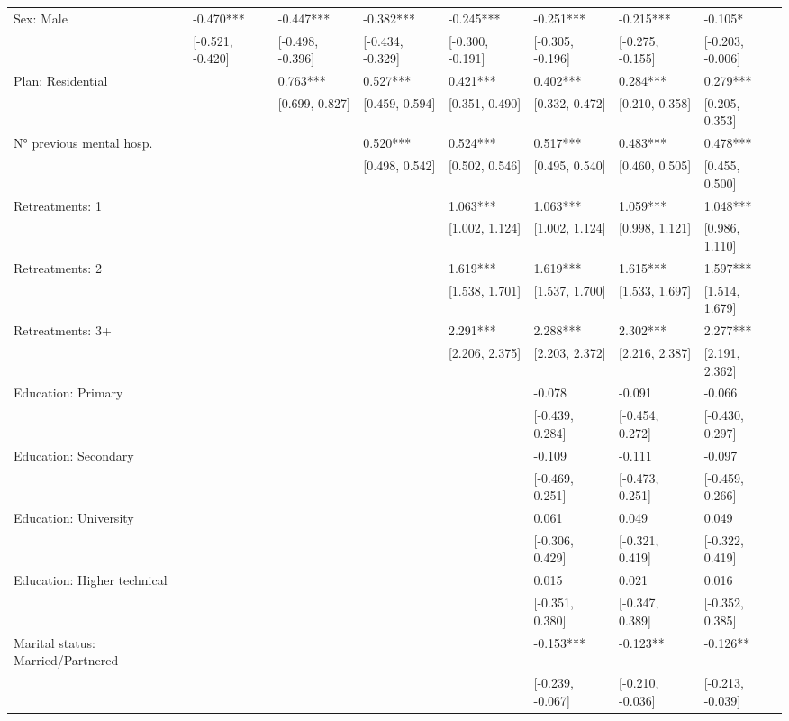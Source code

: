\documentclass[
  spanish,
  10pt,
]{article}
\begin{document}
\begin{table}[H]
{\begin{tabular}[t]{llllllll}
Sex: Male & -0.470*** & -0.447*** & -0.382*** & -0.245*** & -0.251*** & -0.215*** & -0.105*\\
 & {}[-0.521, -0.420] & {}[-0.498, -0.396] & {}[-0.434, -0.329] & {}[-0.300, -0.191] & {}[-0.305, -0.196] & {}[-0.275, -0.155] & {}[-0.203, -0.006]\\
Plan: Residential &  & 0.763*** & 0.527*** & 0.421*** & 0.402*** & 0.284*** & 0.279***\\
 &  & {}[0.699, 0.827] & {}[0.459, 0.594] & {}[0.351, 0.490] & {}[0.332, 0.472] & {}[0.210, 0.358] & {}[0.205, 0.353]\\
N° previous mental hosp. &  &  & 0.520*** & 0.524*** & 0.517*** & 0.483*** & 0.478***\\
 &  &  & {}[0.498, 0.542] & {}[0.502, 0.546] & {}[0.495, 0.540] & {}[0.460, 0.505] & {}[0.455, 0.500]\\
Retreatments: 1 &  &  &  & 1.063*** & 1.063*** & 1.059*** & 1.048***\\
 &  &  &  & {}[1.002, 1.124] & {}[1.002, 1.124] & {}[0.998, 1.121] & {}[0.986, 1.110]\\
Retreatments: 2 &  &  &  & 1.619*** & 1.619*** & 1.615*** & 1.597***\\
 &  &  &  & {}[1.538, 1.701] & {}[1.537, 1.700] & {}[1.533, 1.697] & {}[1.514, 1.679]\\
Retreatments: 3+ &  &  &  & 2.291*** & 2.288*** & 2.302*** & 2.277***\\
 &  &  &  & {}[2.206, 2.375] & {}[2.203, 2.372] & {}[2.216, 2.387] & {}[2.191, 2.362]\\
Education: Primary &  &  &  &  & -0.078 & -0.091 & -0.066\\
 &  &  &  &  & {}[-0.439, 0.284] & {}[-0.454, 0.272] & {}[-0.430, 0.297]\\
Education: Secondary &  &  &  &  & -0.109 & -0.111 & -0.097\\
 &  &  &  &  & {}[-0.469, 0.251] & {}[-0.473, 0.251] & {}[-0.459, 0.266]\\
Education: University &  &  &  &  & 0.061 & 0.049 & 0.049\\
 &  &  &  &  & {}[-0.306, 0.429] & {}[-0.321, 0.419] & {}[-0.322, 0.419]\\
Education: Higher technical &  &  &  &  & 0.015 & 0.021 & 0.016\\
 &  &  &  &  & {}[-0.351, 0.380] & {}[-0.347, 0.389] & {}[-0.352, 0.385]\\
Marital status: Married/Partnered &  &  &  &  & -0.153*** & -0.123** & -0.126**\\
 &  &  &  &  & {}[-0.239, -0.067] & {}[-0.210, -0.036] & {}[-0.213, -0.039]\\

\end{tabular}}
\end{table}
\end{document}

